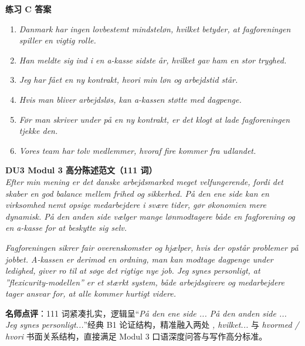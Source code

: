 \begin{answerbox}
\textbf{练习 C 答案}
\begin{enumerate}
  \item \textit{Danmark har ingen lovbestemt mindsteløn, hvilket betyder, at fagforeningen spiller en vigtig rolle.}
  \item \textit{Han meldte sig ind i en a-kasse sidste år, hvilket gav ham en stor tryghed.}
  \item \textit{Jeg har fået en ny kontrakt, hvori min løn og arbejdstid står.}
  \item \textit{Hvis man bliver arbejdsløs, kan a-kassen støtte med dagpenge.}
  \item \textit{Før man skriver under på en ny kontrakt, er det klogt at lade fagforeningen tjekke den.}
  \item \textit{Vores team har tolv medlemmer, hvoraf fire kommer fra udlandet.}
\end{enumerate}

\textbf{DU3 Modul 3 高分陈述范文（111 词）}\\
\textit{Efter min mening er det danske arbejdsmarked meget velfungerende, fordi det skaber en god balance mellem frihed og sikkerhed. På den ene side kan en virksomhed nemt opsige medarbejdere i svære tider,  gør økonomien mere dynamisk. På den anden side vælger mange lønmodtagere både en fagforening og en a-kasse for at beskytte sig selv.}

\textit{Fagforeningen sikrer fair overenskomster og hjælper, hvis der opstår problemer på jobbet. A-kassen er derimod en ordning,  man kan modtage dagpenge under ledighed,  giver ro til at søge det rigtige nye job. Jeg synes personligt, at ”flexicurity-modellen” er et stærkt system,  både arbejdsgivere og medarbejdere tager ansvar for, at alle kommer hurtigt videre.}

\small\textbf{名师点评}：111 词紧凑扎实，逻辑呈“\textit{På den ene side ... På den anden side ... Jeg synes personligt...}”经典 B1 论证结构，精准融入两处 \textit{, hvilket...} 与 \textit{hvormed / hvori} 书面关系结构，直接满足 Modul 3 口语深度问答与写作高分标准。
\end{answerbox}
